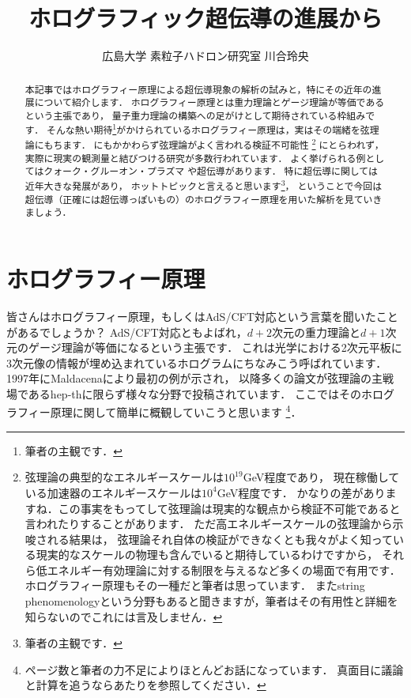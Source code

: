 \documentclass[b5paper,11pt,dvipdfmx]{jsarticle}
\numberwithin{equation}{section}
\theoremstyle{definition}
\begin{document}
\title{ホログラフィック超伝導の進展から}
\author{広島大学 素粒子ハドロン研究室 川合玲央}
\date{}

\maketitle


\begin{abstract}
    本記事ではホログラフィー原理による超伝導現象の解析の試みと，特にその近年の進展について紹介します．
    ホログラフィー原理とは重力理論とゲージ理論が等価であるという主張であり，
    量子重力理論の構築への足がけとして期待されている枠組みです．
    そんな熱い期待\footnote{筆者の主観です．}がかけられているホログラフィー原理は，実はその端緒を弦理論にもちます．
    にもかかわらず弦理論がよく言われる検証不可能性
    \footnote{弦理論の典型的なエネルギースケールは$10^{19}$GeV程度であり，
    現在稼働している加速器のエネルギースケールは$10^4$GeV程度です．
    かなりの差がありますね．この事実をもってして弦理論は現実的な観点から検証不可能であると言われたりすることがあります．
    ただ高エネルギースケールの弦理論から示唆される結果は，
    弦理論それ自体の検証ができなくとも我々がよく知っている現実的なスケールの物理も含んでいると期待しているわけですから，
    それら低エネルギー有効理論に対する制限を与えるなど多くの場面で有用です．
    ホログラフィー原理もその一種だと筆者は思っています．
    またstring phenomenologyという分野もあると聞きますが，筆者はその有用性と詳細を知らないのでこれには言及しません．}
    にとらわれず，実際に現実の観測量と結びつける研究が多数行われています．
    よく挙げられる例としてはクォーク・グルーオン・プラズマ\cite{Policastro01,Kovtun04}
    や超伝導\cite{Hartnoll08a,Hartnoll08b}があります．
    特に超伝導に関しては近年大きな発展があり，
    ホットトピックと言えると思います\footnote{筆者の主観です．}，
    ということで今回は超伝導（正確には超伝導っぽいもの）のホログラフィー原理を用いた解析を見ていきましょう．
\end{abstract}


\section{ホログラフィー原理}
皆さんはホログラフィー原理，もしくはAdS/CFT対応という言葉を聞いたことがあるでしょうか？
AdS/CFT対応ともよばれ，$d + 2$次元の重力理論と$d + 1$次元のゲージ理論が等価になるという主張です．
これは光学における2次元平板に3次元像の情報が埋め込まれているホログラムにちなみこう呼ばれています．
1997年にMaldacenaにより最初の例\cite{Maldacena97}が示され，
以降多くの論文が弦理論の主戦場であるhep-thに限らず様々な分野で投稿されています．
ここではそのホログラフィー原理に関して簡単に概観していこうと思います
\footnote{ページ数と筆者の力不足によりほとんどお話になっています．
真面目に議論と計算を追うなら\cite{Witten98,Aharony99,Bousso02,Ammon15}あたりを参照してください．}．
\end{document}
